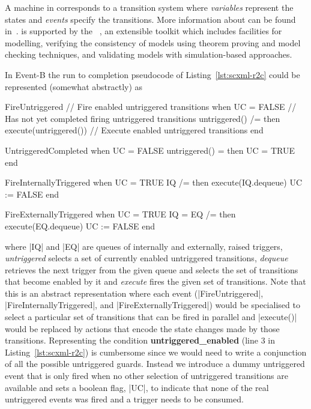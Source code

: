 A machine in \EventB corresponds to a transition system
where \emph{variables} represent the states and \emph{events} specify
the transitions.    More information about \EventB can be found in~\cite{hoang13:_introd_event_b_model_method}.  \EventB is supported by the
\Rodin~\cite{abrial10:_rodin}, an extensible toolkit which includes
facilities for modelling, verifying the consistency of models
using theorem proving and model checking techniques, and validating
models with simulation-based approaches.

In Event-B the run to completion pseudocode of Listing~\ref{lst:scxml-r2c} could be represented (somewhat abstractly) as
\begin{EventBcode}
FireUntriggered // Fire  enabled untriggered transitions
when
    UC = FALSE // Has not yet completed firing untriggered transitions
    untriggered() /= {}
then
    execute(untriggered()) // Execute enabled untriggered transitions
end

UntriggeredCompleted
when
    UC = FALSE
    untriggered() = {}
then
    UC = TRUE
end

FireInternallyTriggered
when
    UC = TRUE
    IQ /= {}
then
    execute(IQ.dequeue)
    UC := FALSE
end

FireExternallyTriggered
when
    UC = TRUE
    IQ = {}
    EQ /= {}
then
    execute(EQ.dequeue)
    UC := FALSE
end
\end{EventBcode}
where |IQ| and |EQ| are queues of internally and externally, raised triggers, \emph{untriggered} selects a set of currently enabled untriggered transitions, \emph{dequeue} retrieves the next trigger from the given queue and selects the set of transitions that become enabled by it and \emph{execute} fires the given set of transitions. 
Note that this is an abstract representation where each event (|FireUntriggered|, |FireInternallyTriggered|, and |FireExternallyTriggered|) would be specialised to select a particular set of transitions that can be fired in parallel and |execute()| would be replaced by actions that encode the state changes made by those transitions.
Representing the condition \textbf{untriggered\_enabled} (line 3 in Listing~\ref{lst:scxml-r2c}) is cumbersome since we would need to write a conjunction of all the possible untriggered guards. Instead we introduce a dummy untriggered event that is only fired when no other selection of untriggered transitions are available and sets a boolean flag, |UC|, to indicate that none of the real untriggered events was fired and a trigger needs to be consumed.

